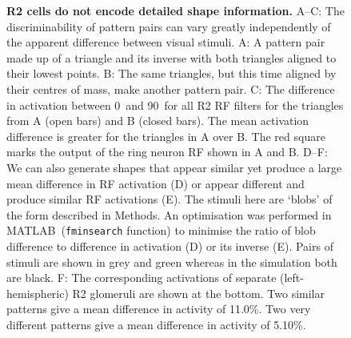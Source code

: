 \documentclass[10pt]{article}
\newcommand{\Matlab}{MATLAB}
\begin{document}
\begin{figure}
	\caption{
		{\bf R2 cells do not encode detailed shape information.}
		A--C: The discriminability of pattern pairs can vary greatly independently of the apparent difference between visual stimuli. A: A pattern pair made up of a triangle and its inverse with both triangles aligned to their lowest points. B: The same triangles, but this time aligned by their centres of mass, make another pattern pair. C: The difference in activation between 0\degree\ and 90\degree\ for all R2 RF filters for the triangles from A (open bars) and B (closed bars). The mean activation difference is greater for the triangles in A over B. The red square marks the output of the ring neuron \ac{RF} shown in A and B. 
		D--F: We can also generate shapes that appear similar yet produce a large mean difference in RF activation (D) or appear different and produce similar RF activations (E). The stimuli here are `blobs' of the form described in Methods. An optimisation was performed in \Matlab\ (\texttt{fminsearch} function) to minimise the ratio of blob difference to difference in activation (D) or its inverse (E). Pairs of stimuli are shown in grey and green whereas in the simulation both are black.
		F: The corresponding activations of separate (left-hemispheric) R2 glomeruli are shown at the bottom. Two similar patterns give a mean difference in activity of 11.0\%. Two very different patterns give a mean difference in activity of 5.10\%.
	}
	\label{fig:simdiffpatts}
\end{figure}
\end{document}
